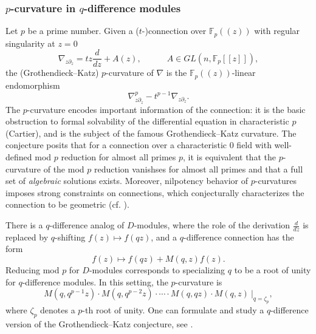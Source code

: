 \documentclass[reqno]{amsart}
\numberwithin{equation}{section}
\numberwithin{equation}{section}
\numberwithin{equation}{section}
\theoremstyle{definition}
\theoremstyle{remark}
\theoremstyle{remark}
\begin{document}
\subsubsection{$p$-curvature in $q$-difference modules}
Let $p$ be a prime number. Given a ($t$-)connection over $\mathbb{F}_p(\!(z)\!)$ with regular singularity at $z=0$
\begin{equation}
    \nabla_{z \partial_z} = t z \frac{d}{dz} + A(z), \quad \quad \quad A \in GL(n, \mathbb{F}_p[\![z]\!]),
\end{equation}
the (Grothendieck--Katz) $p$-curvature of $\nabla$ is the $\mathbb{F}_p(\!(z)\!)$-linear endomorphism
\begin{equation}\label{eqn:p-curvature}
    \nabla_{z \partial_z}^p - t^{p-1} \nabla_{z \partial_z}.
\end{equation}
The $p$-curvature encodes important information of the connection: it is the basic obstruction to formal solvability of the differential equation in characteristic $p$ (Cartier), and is the subject of the famous Grothendieck--Katz curvature. The conjecture posits that for a connection over a characteristic $0$ field with well-defined mod $p$ reduction for almost all primes $p$, it is equivalent that the $p$-curvature of the mod $p$ reduction vanishses for almost all primes and that a full set of \emph{algebraic} solutions exists. Moreover, nilpotency behavior of $p$-curvatures imposes strong constraints on connections, which conjecturally characterizes the connection to be geometric (cf. \cite{katz-nilpotent}).

There is a $q$-difference analog of $D$-modules, where the role of the derivation $\frac{d}{dz}$ is replaced by $q$-shifting $f(z) \mapsto f(qz)$, and a $q$-difference connection has the form
\begin{equation}
    f(z) \mapsto f(qz) + M(q,z)f(z).
\end{equation}
Reducing mod $p$ for $D$-modules corresponds to specializing $q$ to be a root of unity for $q$-difference modules. In this setting, the $p$-curvature is
\begin{equation}\label{eqn:q-p-curvature}
    M(q,q^{p-1}z) \cdot M(q, q^{p-2}z) \cdot \cdots \cdot M(q, qz) \cdot M(q,z) \ |_{q=\zeta_p},
\end{equation}
where $\zeta_p$ denotes a $p$-th root of unity. One can formulate and study a $q$-difference version of the Grothendieck--Katz conjecture, see \cite{q-grothendieck-katz}.
\end{document}
